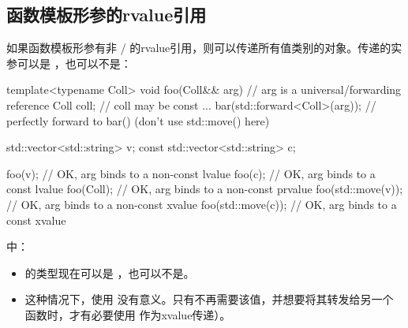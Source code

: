 \subsection{函数模板形参的rvalue引用}

如果函数模板形参有非 / 的rvalue引用，则可以传递所有值类别的对象。传递的实参可以是 ，也可以不是：

\begin{cppcode}
template<typename Coll>
void foo(Coll&& arg) // arg is a universal/forwarding reference
{
	Coll coll; // coll may be const
	...
	bar(std::forward<Coll>(arg)); // perfectly forward to bar() (don’t use std::move() here)
}

std::vector<std::string> v;
const std::vector<std::string> c;

foo(v); // OK, arg binds to a non-const lvalue
foo(c); // OK, arg binds to a const lvalue
foo(Coll{}); // OK, arg binds to a non-const prvalue
foo(std::move(v)); // OK, arg binds to a non-const xvalue
foo(std::move(c)); // OK, arg binds to a const xvalue
\end{cppcode}

 中：

\begin{itemize}
	\item {} 的类型现在可以是 ，也可以不是。
	\item 这种情况下，使用  没有意义。只有不再需要该值，并想要将其转发给另一个函数时，才有必要使用  作为xvalue传递）。
\end{itemize}












